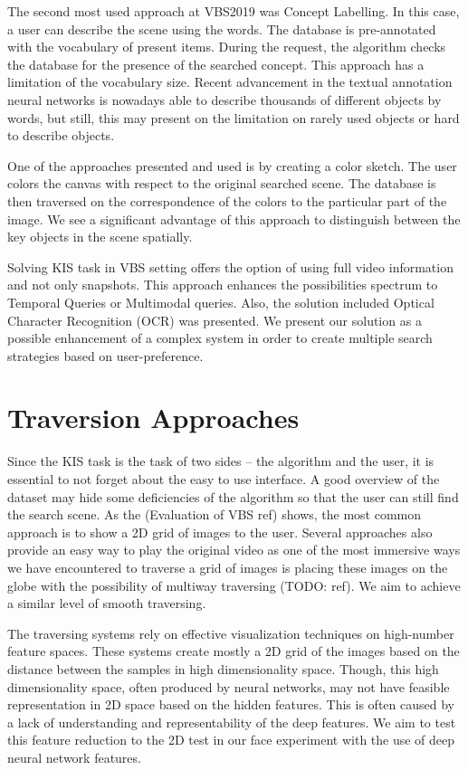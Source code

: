 The second most used approach at VBS2019 was Concept Labelling. In this case, a user can describe the scene using the words. The database is pre-annotated with the vocabulary of present items. During the request, the algorithm checks the database for the presence of the searched concept. This approach has a limitation of the vocabulary size. Recent advancement in the textual annotation neural networks is nowadays able to describe thousands of different objects by words, but still, this may present on the limitation on rarely used objects or hard to describe objects.

One of the approaches presented and used is by creating a color sketch. The user colors the canvas with respect to the original searched scene. The database is then traversed on the correspondence of the colors to the particular part of the image. We see a significant advantage of this approach to distinguish between the key objects in the scene spatially.
 
Solving KIS task in VBS setting offers the option of using full video information and not only snapshots. This approach enhances the possibilities spectrum to Temporal Queries or Multimodal queries. Also, the solution included Optical Character Recognition (OCR) was presented. We present our solution as a possible enhancement of a complex system in order to create multiple search strategies based on user-preference. 

\section*{Traversion Approaches}

Since the KIS task is the task of two sides -- the algorithm and the user, it is essential to not forget about the easy to use interface. A good overview of the dataset may hide some deficiencies of the algorithm so that the user can still find the search scene. As the  (Evaluation of VBS ref) shows, the most common approach is to show a 2D grid of images to the user. Several approaches also provide an easy way to play the original video as one of the most immersive ways we have encountered to traverse a grid of images is placing these images on the globe with the possibility of multiway traversing (TODO: ref). We aim to achieve a similar level of smooth traversing.

The traversing systems rely on effective visualization techniques on high-number feature spaces. These systems create mostly a 2D grid of the images based on the distance between the samples in high dimensionality space. Though, this high dimensionality space, often produced by neural networks, may not have feasible representation in 2D space based on the hidden features. This is often caused by a lack of understanding and representability of the deep features. We aim to test this feature reduction to the 2D test in our face experiment with the use of deep neural network features.

